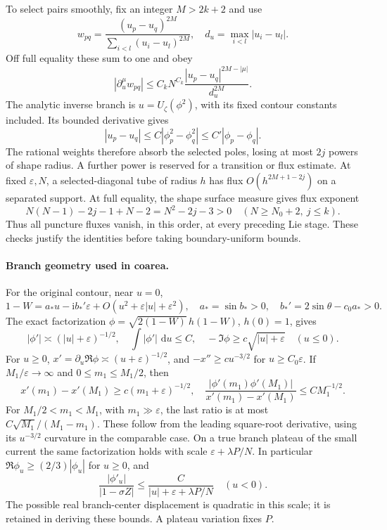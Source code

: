 \documentclass[11pt]{article}
\numberwithin{equation}{section}
\theoremstyle{definition}
\newcommand{\ii}{\mathrm i}
\newcommand{\dd}{\,\mathrm d}
\newcommand{\eps}{\varepsilon}
\begin{document}
To select pairs smoothly, fix an integer $M>2k+2$ and use
\[
 w_{pq}=\frac{(u_p-u_q)^{2M}}{\sum_{i<l}(u_i-u_l)^{2M}},\quad
 d_u=\max_{i<l}|u_i-u_l|.
\]
Off full equality these sum to one and obey
\[
 |\partial_u^\mu w_{pq}|
 \le C_kN^{C_k}\frac{|u_p-u_q|^{2M-|\mu|}}{d_u^{2M}}.
\]
The analytic inverse branch is \(u=U_\zeta(\phi^2)\), with its
fixed contour constants included. Its bounded derivative gives
\[
 |u_p-u_q|\le C|\phi_p^2-\phi_q^2|
                  \le C'|\phi_p-\phi_q|.
\]
The rational weights therefore absorb the
selected poles, losing at most $2j$ powers of shape radius. A further
power is reserved for a transition or flux estimate.
At fixed $\eps,N$, a selected-diagonal tube of radius $h$ has flux
$O(h^{2M+1-2j})$ on a separated support. At full equality, the shape
surface measure gives flux exponent
\[
 N(N-1)-2j-1+N-2=N^2-2j-3>0
 \quad(N\ge N_0+2,\ j\le k).
\]
Thus all puncture fluxes vanish, in this order, at every preceding Lie
stage. These checks justify the identities before taking boundary-uniform
bounds.

\paragraph{Branch geometry used in coarea.}
For the original contour, near $u=0$,
\[
 1-W=a_*u-\ii b_*'\eps+O(u^2+\eps|u|+\eps^2),
 \quad a_*=\sin b_*>0,\quad b_*'=2\sin\theta-c_0a_*>0.
\]
The exact factorization $\phi=\sqrt{2(1-W)}\,h(1-W)$, $h(0)=1$,
gives
\[
 |\phi'|\asymp(|u|+\eps)^{-1/2},\quad
 \int|\phi'|\,\dd u\le C,\quad
 -\Im\phi\ge c\sqrt{|u|+\eps}\quad(u\le0).
\]
For $u\ge0$, $x'=\partial_u\Re\phi\asymp(u+\eps)^{-1/2}$,
and $-x''\ge cu^{-3/2}$ for $u\ge C_0\eps$.
If $M_1/\eps\to\infty$ and $0\le m_1\le M_1/2$, then
\[
 x'(m_1)-x'(M_1)\ge c(m_1+\eps)^{-1/2},\quad
 \frac{|\phi'(m_1)\phi'(M_1)|}{x'(m_1)-x'(M_1)}\le CM_1^{-1/2}.
\]
For $M_1/2<m_1<M_1$, with $m_1\gg\eps$, the last ratio is at most
$C\sqrt{M_1}/(M_1-m_1)$. These follow from the leading square-root
derivative, using its $u^{-3/2}$ curvature in the comparable case.
On a true branch plateau of the small current the same factorization
holds with scale $\eps+\lambda P/N$. In particular
$\Re\phi_u\ge(2/3)|\phi_u|$ for $u\ge0$, and
\begin{equation}
 \frac{|\phi'_u|}{|1-\sigma Z|}
 \le\frac C{|u|+\eps+\lambda P/N}\quad(u<0).
 \label{iso:negative-branch}
\end{equation}
The possible real branch-center displacement is quadratic in this scale;
it is retained in deriving these bounds. A plateau variation fixes $P$.
\end{document}

